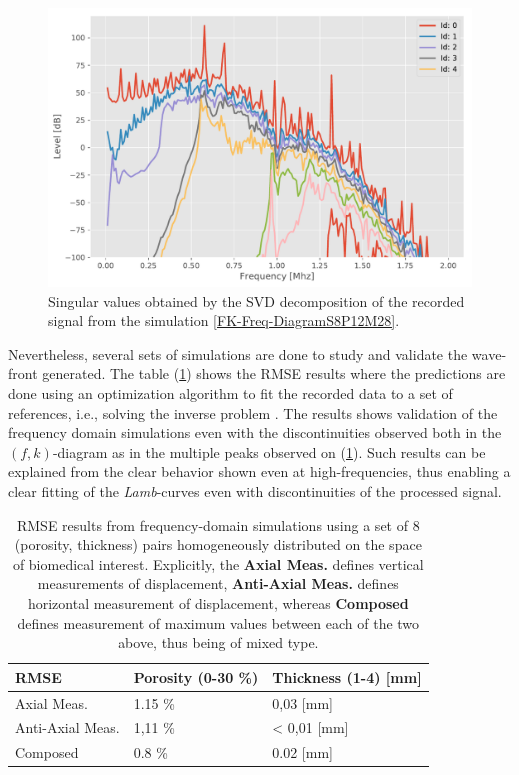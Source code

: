 \begin{figure}[!h]
	\centering
	\includegraphics[scale=.5]{images/FreqRes/2DFreqS812Elastic28_SV.pdf}
	\caption{Singular values obtained by the SVD decomposition of the recorded signal from the simulation \ref{FK-Freq-DiagramS8P12M28}.}
	\label{SVD-Freq-S8P12M28}
\end{figure}


Nevertheless, several sets of simulations are done to study and validate the wave-front generated. The table (\ref{FreqInvTable}) shows the RMSE results where the predictions are done using an optimization algorithm to fit the recorded data to a set of references, i.e., solving the inverse problem \cite{Minonzio2018}. The results shows validation of the frequency domain simulations even with the discontinuities observed both in the $(f,k)$-diagram as in the multiple peaks observed on (\ref{SVD-Freq-S8P12M28}). Such results can be explained from the clear behavior shown even at high-frequencies, thus enabling a clear fitting of the \textit{Lamb}-curves even with discontinuities of the processed signal.
\begin{table}[!h]
\centering
    \begin{tabular}{l l l}
    \toprule
    \textbf{RMSE} & \textbf{Porosity} (0-30 \%) & \textbf{Thickness} (1-4) [mm]\\
    \midrule
    Axial Meas. & 1.15 \% & 0,03  [mm]\\
    Anti-Axial Meas. & 1,11 \%  & < 0,01 [mm]\\
    Composed & 0.8 \% & 0.02 [mm] \\
    \bottomrule
    \end{tabular}
    \caption{RMSE results from frequency-domain simulations using a set of 8 (porosity, thickness) pairs homogeneously distributed on the space of biomedical interest. Explicitly, the \textbf{Axial Meas.} defines vertical measurements of displacement, \textbf{Anti-Axial Meas.} defines horizontal measurement of displacement, whereas \textbf{Composed} defines measurement of maximum values between each of the two above, thus being of mixed type.}
    \label{FreqInvTable}
\end{table}

